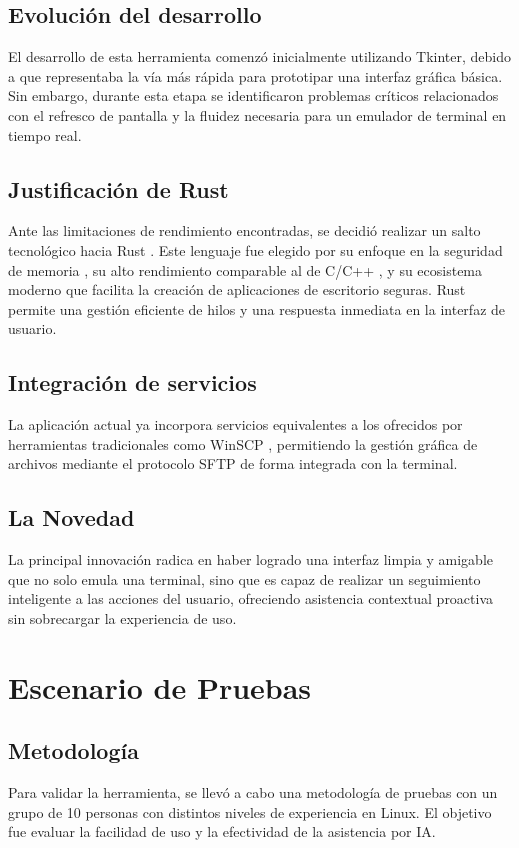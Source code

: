 \documentclass[conference]{IEEEtran} %
\begin{document}
\subsection{Evolución del desarrollo}
El desarrollo de esta herramienta comenzó inicialmente utilizando Tkinter, debido a que representaba la vía más rápida para prototipar una interfaz gráfica básica. Sin embargo, durante esta etapa se identificaron problemas críticos relacionados con el refresco de pantalla y la fluidez necesaria para un emulador de terminal en tiempo real.

\subsection{Justificación de Rust}
Ante las limitaciones de rendimiento encontradas, se decidió realizar un salto tecnológico hacia Rust \cite{klabnik2019rust}. Este lenguaje fue elegido por su enfoque en la seguridad de memoria \cite{jung2017rustbelt}, su alto rendimiento comparable al de C/C++ \cite{levy2017rust}, y su ecosistema moderno que facilita la creación de aplicaciones de escritorio seguras. Rust permite una gestión eficiente de hilos y una respuesta inmediata en la interfaz de usuario.

\subsection{Integración de servicios}
La aplicación actual ya incorpora servicios equivalentes a los ofrecidos por herramientas tradicionales como WinSCP \cite{mobaxterm_misc}, permitiendo la gestión gráfica de archivos mediante el protocolo SFTP de forma integrada con la terminal.

\subsection{La Novedad}
La principal innovación radica en haber logrado una interfaz limpia y amigable que no solo emula una terminal, sino que es capaz de realizar un seguimiento inteligente a las acciones del usuario, ofreciendo asistencia contextual proactiva sin sobrecargar la experiencia de uso.

\section{Escenario de Pruebas}
\label{sec:pruebas}
\subsection{Metodología}
Para validar la herramienta, se llevó a cabo una metodología de pruebas con un grupo de 10 personas con distintos niveles de experiencia en Linux. El objetivo fue evaluar la facilidad de uso y la efectividad de la asistencia por IA.
\end{document}

